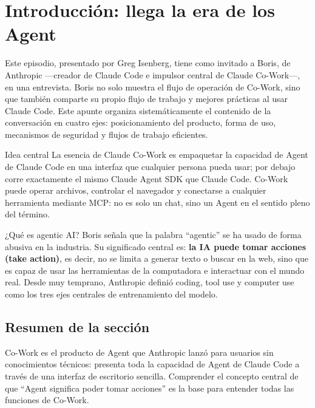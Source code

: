 \section{Introducción: llega la era de los Agent}

Este episodio, presentado por Greg Isenberg, tiene como invitado a Boris, de Anthropic —creador de Claude Code e impulsor central de Claude Co-Work—, en una entrevista. Boris no solo muestra el flujo de operación de Co-Work, sino que también comparte su propio flujo de trabajo y mejores prácticas al usar Claude Code. Este apunte organiza sistemáticamente el contenido de la conversación en cuatro ejes: posicionamiento del producto, forma de uso, mecanismos de seguridad y flujos de trabajo eficientes.

\begin{importantbox}{Idea central}
La esencia de Claude Co-Work es empaquetar la capacidad de Agent de Claude Code en una interfaz que cualquier persona pueda usar; por debajo corre exactamente el mismo Claude Agent SDK que Claude Code. Co-Work puede operar archivos, controlar el navegador y conectarse a cualquier herramienta mediante MCP: no es solo un chat, sino un Agent en el sentido pleno del término.
\end{importantbox}

\begin{knowledgebox}{¿Qué es agentic AI?}
Boris señala que la palabra ``agentic'' se ha usado de forma abusiva en la industria. Su significado central es: \textbf{la IA puede tomar acciones (take action)}, es decir, no se limita a generar texto o buscar en la web, sino que es capaz de usar las herramientas de la computadora e interactuar con el mundo real. Desde muy temprano, Anthropic definió coding, tool use y computer use como los tres ejes centrales de entrenamiento del modelo.
\end{knowledgebox}

\subsection{Resumen de la sección}

Co-Work es el producto de Agent que Anthropic lanzó para usuarios sin conocimientos técnicos: presenta toda la capacidad de Agent de Claude Code a través de una interfaz de escritorio sencilla. Comprender el concepto central de que ``Agent significa poder tomar acciones'' es la base para entender todas las funciones de Co-Work.

